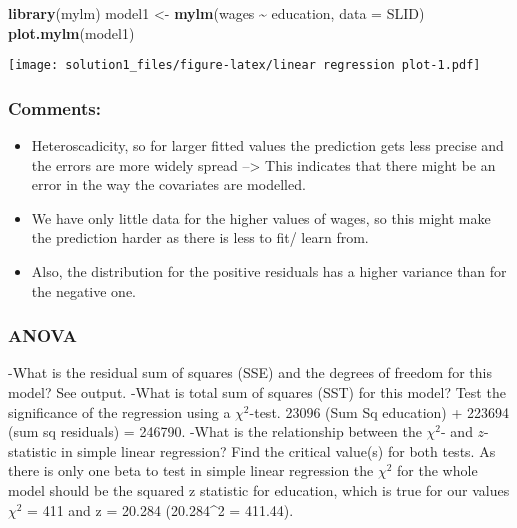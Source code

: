 \documentclass[
]{article}
\newenvironment{Shaded}{\begin{snugshade}}{\end{snugshade}}
\newcommand{\AttributeTok}[1]{\textcolor[rgb]{0.13,0.29,0.53}{#1}}
\newcommand{\FunctionTok}[1]{\textcolor[rgb]{0.13,0.29,0.53}{\textbf{#1}}}
\newcommand{\NormalTok}[1]{#1}
\newcommand{\OtherTok}[1]{\textcolor[rgb]{0.56,0.35,0.01}{#1}}
\newcommand{\SpecialCharTok}[1]{\textcolor[rgb]{0.81,0.36,0.00}{\textbf{#1}}}
\providecommand{\tightlist}{%
  \setlength{\itemsep}{0pt}\setlength{\parskip}{0pt}}
\begin{document}
\begin{Shaded}
\begin{Highlighting}[]
\FunctionTok{library}\NormalTok{(mylm)}
\NormalTok{model1 }\OtherTok{\textless{}{-}} \FunctionTok{mylm}\NormalTok{(wages }\SpecialCharTok{\textasciitilde{}}\NormalTok{ education, }\AttributeTok{data =}\NormalTok{ SLID)}
\FunctionTok{plot.mylm}\NormalTok{(model1)}
\end{Highlighting}
\end{Shaded}

\texttt{[image: solution1\_files/figure-latex/linear regression plot-1.pdf]}

\hypertarget{comments}{%
\subsubsection{Comments:}\label{comments}}

\begin{itemize}
\tightlist
\item
  Heteroscadicity, so for larger fitted values the prediction gets less
  precise and the errors are more widely spread --\textgreater{} This
  indicates that there might be an error in the way the covariates are
  modelled.
\item
  We have only little data for the higher values of wages, so this might
  make the prediction harder as there is less to fit/ learn from.
\item
  Also, the distribution for the positive residuals has a higher
  variance than for the negative one.
\end{itemize}

\hypertarget{anova}{%
\subsubsection{ANOVA}\label{anova}}

-What is the residual sum of squares (SSE) and the degrees of freedom
for this model? See output. -What is total sum of squares (SST) for this
model? Test the significance of the regression using a \(\chi^2\)-test.
23096 (Sum Sq education) + 223694 (sum sq residuals) = 246790. -What is
the relationship between the \(\chi^2\)- and \(z\)-statistic in simple
linear regression? Find the critical value(s) for both tests. As there
is only one beta to test in simple linear regression the \(\chi^2\) for
the whole model should be the squared z statistic for education, which
is true for our values \(\chi^2\) = 411 and z = 20.284 (20.284\^{}2 =
411.44).
\end{document}
